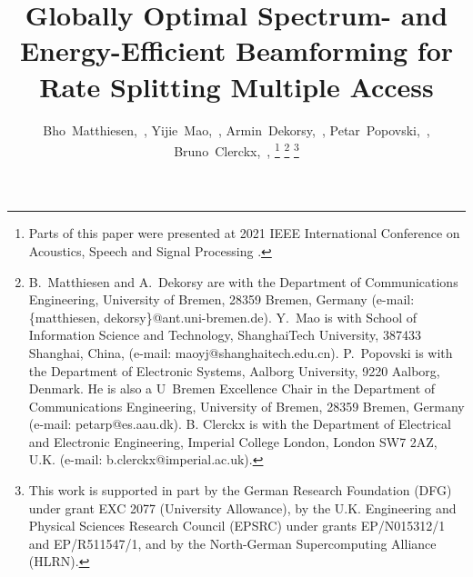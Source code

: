 \documentclass[a4paper,10pt,journal]{IEEEtran}
\begin{document}
\title{Globally Optimal Spectrum- and Energy-Efficient Beamforming for Rate Splitting Multiple Access}

\author{
	Bho~Matthiesen,~,
	Yijie~Mao,~,
	Armin~Dekorsy,~,
	Petar~Popovski,~,
	Bruno~Clerckx,~,
	\thanks{
		Parts of this paper were presented at 2021 IEEE International Conference on Acoustics, Speech and Signal Processing \cite{icassp2021}.
	}%
	\thanks{
	B.~Matthiesen and A.~Dekorsy are with the Department of Communications Engineering, University of Bremen, 28359 Bremen, Germany (e-mail: \{matthiesen, dekorsy\}@ant.uni-bremen.de).
	Y.~Mao is with School of Information Science and Technology, ShanghaiTech University, 387433 Shanghai, China, (e-mail: maoyj@shanghaitech.edu.cn).
	P.~Popovski is with the Department of Electronic Systems, Aalborg University, 9220 Aalborg, Denmark. He is also a U~Bremen Excellence Chair in the Department of Communications Engineering, University of Bremen, 28359 Bremen, Germany (e-mail: petarp@es.aau.dk).
	B. Clerckx is with the Department of Electrical and Electronic Engineering, Imperial College London, London SW7 2AZ, U.K. (e-mail: b.clerckx@imperial.ac.uk).
	}%
	\thanks{This work is supported in part by the German Research Foundation (DFG) under grant EXC 2077 (University Allowance), by the U.K. Engineering and Physical Sciences Research Council (EPSRC) under grants EP/N015312/1 and EP/R511547/1, and by the North-German Supercomputing Alliance (HLRN).
	}
}

\maketitle
\end{document}
